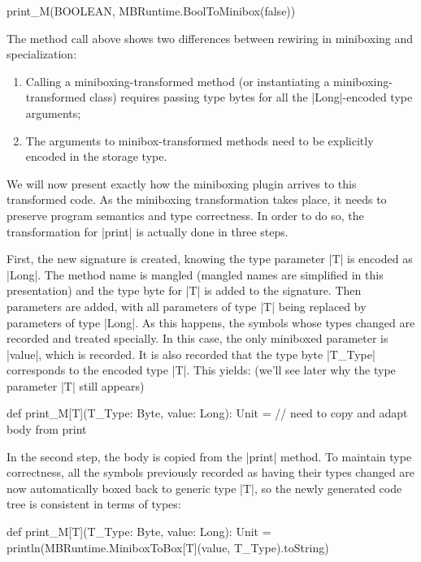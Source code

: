 \begin{lstlisting-nobreak}
 print_M(BOOLEAN, MBRuntime.BoolToMinibox(false))
\end{lstlisting-nobreak}

The method call above shows two differences between rewiring in miniboxing and specialization:
\begin{enumerate}
  \item Calling a miniboxing-transformed method (or instantiating a miniboxing-transformed class) requires passing type bytes for all the |Long|-encoded type arguments;
  \item The arguments to minibox-transformed methods need to be explicitly encoded in the storage type.
\end{enumerate}

We will now present exactly how the miniboxing plugin arrives to this transformed code. As the miniboxing transformation takes place, it needs to preserve program semantics and type correctness. In order to do so, the transformation for |print| is actually done in three steps.

First, the new signature is created, knowing the type parameter |T| is encoded as |Long|. The method name is mangled (mangled names are simplified in this presentation) and the type byte for |T| is added to the signature. Then parameters are added, with all parameters of type |T| being replaced by parameters of type |Long|. As this happens, the symbols whose types changed are recorded and treated specially. In this case, the only miniboxed parameter is |value|, which is recorded. It is also recorded that the type byte |T_Type| corresponds to the encoded type |T|. This yields: (we'll see later why the type parameter |T| still appears)

\begin{lstlisting-nobreak}
 def print_M[T](T_Type: Byte, value: Long): Unit = // need to copy and adapt body from print
\end{lstlisting-nobreak}

In the second step, the body is copied from the |print| method. To maintain type correctness, all the symbols previously recorded as having their types changed are now automatically boxed back to generic type |T|, so the newly generated code tree is consistent in terms of types:

\begin{lstlisting-nobreak}
 def print_M[T](T_Type: Byte, value: Long): Unit = println(MBRuntime.MiniboxToBox[T](value, T_Type).toString)
\end{lstlisting-nobreak}

